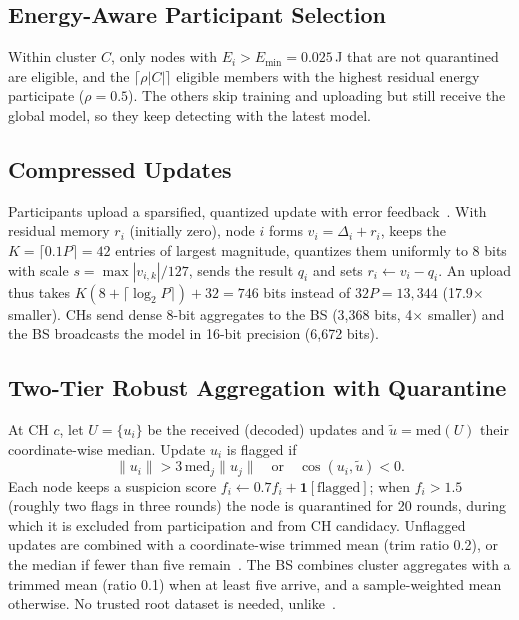 \documentclass[journal]{IEEEtran}
\begin{document}
\subsection{Energy-Aware Participant Selection}
Within cluster $C$, only nodes with $E_i>E_{\min}=0.025$\,J that are not quarantined are eligible, and the $\lceil\rho|C|\rceil$ eligible members with the highest residual energy participate ($\rho=0.5$). The others skip training and uploading but still receive the global model, so they keep detecting with the latest model.

\subsection{Compressed Updates}
Participants upload a sparsified, quantized update with error feedback~\cite{stich2018,lin2018dgc}. With residual memory $r_i$ (initially zero), node $i$ forms $v_i=\Delta_i+r_i$, keeps the $K=\lceil0.1P\rceil=42$ entries of largest magnitude, quantizes them uniformly to 8 bits with scale $s=\max|v_{i,k}|/127$, sends the result $q_i$ and sets $r_i\leftarrow v_i-q_i$.  An upload thus takes $K(8+\lceil\log_2P\rceil)+32=746$ bits instead of $32P=13{,}344$ (17.9$\times$ smaller). CHs send dense 8-bit aggregates to the BS (3,368 bits, 4$\times$ smaller) and the BS broadcasts the model in 16-bit precision (6,672 bits).

\subsection{Two-Tier Robust Aggregation with Quarantine}
At CH $c$, let $U=\{u_i\}$ be the received (decoded) updates and $\tilde u=\mathrm{med}(U)$ their coordinate-wise median. Update $u_i$ is flagged if
\begin{equation}
\|u_i\|>3\,\mathrm{med}_j\|u_j\|\quad\text{or}\quad\cos(u_i,\tilde u)<0 .
\end{equation}
Each node keeps a suspicion score $f_i\leftarrow0.7f_i+\mathbf{1}[\text{flagged}]$; when $f_i>1.5$ (roughly two flags in three rounds) the node is quarantined for 20 rounds, during which it is excluded from participation and from CH candidacy. Unflagged updates are combined with a coordinate-wise trimmed mean (trim ratio 0.2), or the median if fewer than five remain~\cite{yin2018}. The BS combines cluster aggregates with a trimmed mean (ratio 0.1) when at least five arrive, and a sample-weighted mean otherwise. No trusted root dataset is needed, unlike~\cite{cao2021}.
\end{document}
